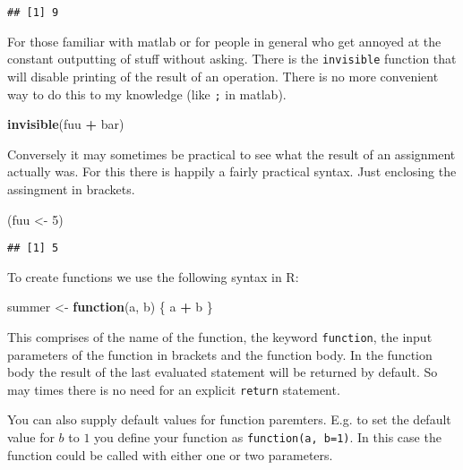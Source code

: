 \documentclass[]{article}
\newenvironment{Shaded}{\begin{snugshade}}{\end{snugshade}}
\newcommand{\KeywordTok}[1]{\textcolor[rgb]{0.13,0.29,0.53}{\textbf{#1}}}
\newcommand{\DecValTok}[1]{\textcolor[rgb]{0.00,0.00,0.81}{#1}}
\newcommand{\StringTok}[1]{\textcolor[rgb]{0.31,0.60,0.02}{#1}}
\newcommand{\ControlFlowTok}[1]{\textcolor[rgb]{0.13,0.29,0.53}{\textbf{#1}}}
\newcommand{\OperatorTok}[1]{\textcolor[rgb]{0.81,0.36,0.00}{\textbf{#1}}}
\newcommand{\NormalTok}[1]{#1}
\begin{document}
\begin{verbatim}
## [1] 9
\end{verbatim}

For those familiar with matlab or for people in general who get annoyed
at the constant outputting of stuff without asking. There is the
\texttt{invisible} function that will disable printing of the result of
an operation. There is no more convenient way to do this to my knowledge
(like \texttt{;} in matlab).

\begin{Shaded}
\begin{Highlighting}[]
\KeywordTok{invisible}\NormalTok{(fuu }\OperatorTok{+}\StringTok{ }\NormalTok{bar)}
\end{Highlighting}
\end{Shaded}

Conversely it may sometimes be practical to see what the result of an
assignment actually was. For this there is happily a fairly practical
syntax. Just enclosing the assingment in brackets.

\begin{Shaded}
\begin{Highlighting}[]
\NormalTok{(fuu <-}\StringTok{ }\DecValTok{5}\NormalTok{)}
\end{Highlighting}
\end{Shaded}

\begin{verbatim}
## [1] 5
\end{verbatim}

To create functions we use the following syntax in R:

\begin{Shaded}
\begin{Highlighting}[]
\NormalTok{summer <-}\StringTok{ }\ControlFlowTok{function}\NormalTok{(a, b) \{}
\NormalTok{  a }\OperatorTok{+}\StringTok{ }\NormalTok{b}
\NormalTok{\}}
\end{Highlighting}
\end{Shaded}

This comprises of the name of the function, the keyword
\texttt{function}, the input parameters of the function in brackets and
the function body. In the function body the result of the last evaluated
statement will be returned by default. So may times there is no need for
an explicit \texttt{return} statement.

You can also supply default values for function paremters. E.g. to set
the default value for \(b\) to \(1\) you define your function as
\texttt{function(a,\ b=1)}. In this case the function could be called
with either one or two parameters.
\end{document}
